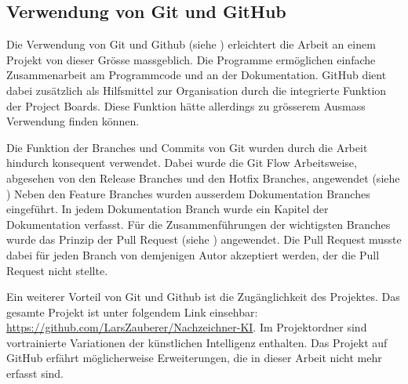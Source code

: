 \subsection{Verwendung von Git und GitHub}\label{sub:d_reflex_git} Die
Verwendung von Git und Github (siehe ) erleichtert die
Arbeit an einem Projekt von dieser Grösse massgeblich. Die Programme ermöglichen
einfache Zusammenarbeit am Programmcode und an der Dokumentation. GitHub dient
dabei zusätzlich als Hilfsmittel zur Organisation durch die integrierte Funktion
der Project Boards. Diese Funktion hätte allerdings zu grösserem Ausmass
Verwendung finden können.

Die Funktion der Branches und Commits von Git wurden durch die Arbeit hindurch
konsequent verwendet. Dabei wurde die Git Flow Arbeitsweise, abgesehen von den
Release Branches und den Hotfix Branches, angewendet (siehe
) Neben den Feature Branches wurden ausserdem
Dokumentation Branches eingeführt. In jedem Dokumentation Branch wurde ein
Kapitel der Dokumentation verfasst. Für die Zusammenführungen der wichtigsten
Branches wurde das Prinzip der Pull Request (siehe )
angewendet. Die Pull Request musste dabei für jeden Branch von demjenigen Autor
akzeptiert werden, der die Pull Request nicht stellte.

Ein weiterer Vorteil von Git und Github ist die Zugänglichkeit des Projektes.
Das gesamte Projekt ist unter folgendem Link einsehbar:
\url{https://github.com/LarsZauberer/Nachzeichner-KI}. Im Projektordner sind
vortrainierte Variationen der künstlichen Intelligenz enthalten. Das Projekt auf
GitHub erfährt möglicherweise Erweiterungen, die in dieser Arbeit nicht mehr
erfasst sind.
